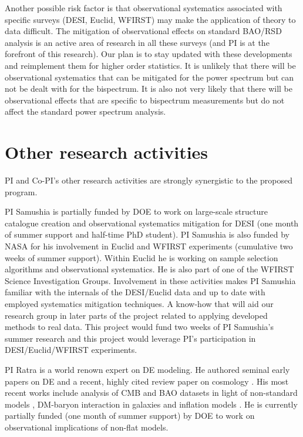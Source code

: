 Another possible risk factor is that observational systematics associated with
specific surveys (DESI, Euclid, WFIRST) may make the application of theory to
data difficult. The mitigation of observational effects on standard BAO/RSD
analysis is an active area of research in all these surveys (and PI is at the
forefront of this research). Our plan is to stay updated with these
developments and reimplement them for higher order statistics. It is unlikely
that there will be observational systematics that can be mitigated for the
power spectrum but can not be dealt with for the bispectrum. It is also not
very likely that there will be observational effects that are specific to
bispectrum measurements but do not affect the standard power spectrum analysis.

\section{Other research activities}

PI and Co-PI's other research activities are strongly synergistic to the
proposed program.

PI Samushia is partially funded by DOE to work on large-scale structure
catalogue creation and observational systematics mitigation for DESI (one month of
summer support and half-time PhD student). PI Samushia is also funded by NASA
for his involvement in Euclid and WFIRST experiments (cumulative two weeks of
summer support). Within Euclid he is working on sample selection algorithms
and observational systematics. He is also part of one of the WFIRST Science
Investigation Groups. Involvement in these activities makes PI Samushia
familiar with  the internals of the DESI/Euclid data and up to date with
employed systematics mitigation techniques. A know-how that will aid our
research group in later parts of the project related to applying  developed
methods to real data. This project would fund two weeks of PI Samushia's
summer research and this project would leverage PI's participation in
DESI/Euclid/WFIRST experiments.

PI Ratra is a world renown expert on DE modeling. He authored seminal early
papers on DE \cite{1988ApJ...325L..17P,1988PhRvD..37.3406R} and a
recent, highly cited review paper on cosmology \cite{2003RvMP...75..559P}.  His
most recent works include analysis of CMB and BAO datasets in light of
non-standard models
\cite{2018arXiv180305522P,2018arXiv180707421P,2018arXiv180903598P,2018MNRAS.479.4566M,2018MNRAS.480..759R},
DM-baryon interaction in galaxies \cite{2018arXiv180905938Y} and inflation
models \cite{2017PhRvD..96j3534R}. He is currently partially funded (one month
of summer support) by DOE to work on observational implications of non-flat
models.

